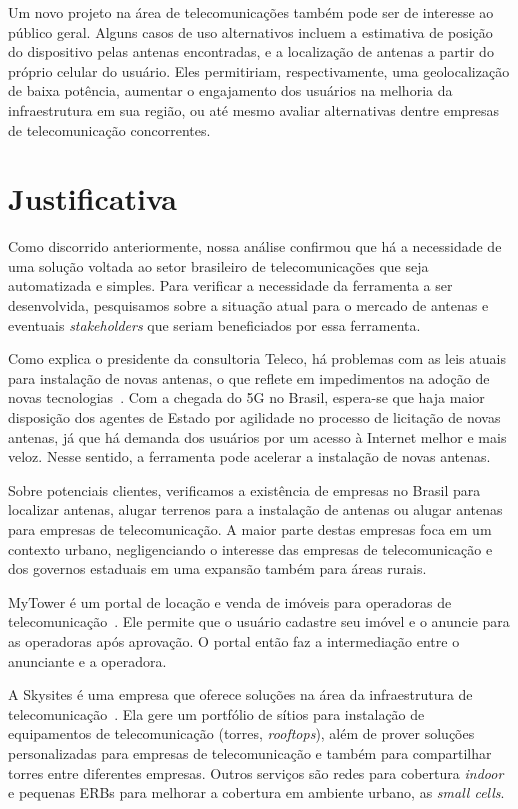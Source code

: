 \documentclass[]{politex}
\begin{document}
Um novo projeto na área de telecomunicações também pode ser de interesse ao
público geral. Alguns casos de uso alternativos incluem a estimativa de posição
do dispositivo pelas antenas encontradas, e a localização de antenas a partir do
próprio celular do usuário. Eles permitiriam, respectivamente, uma
geolocalização de baixa potência, aumentar o engajamento dos usuários na
melhoria da infraestrutura em sua região, ou até mesmo avaliar alternativas
dentre empresas de telecomunicação concorrentes.

\section{Justificativa}

Como discorrido anteriormente, nossa análise confirmou
que há a necessidade de uma solução voltada ao setor brasileiro de
telecomunicações que seja automatizada e simples. Para verificar a necessidade
da ferramenta a ser desenvolvida, pesquisamos sobre a situação atual para o
mercado de antenas e eventuais \textit{stakeholders} que seriam beneficiados por
essa ferramenta.

Como explica o presidente da consultoria Teleco, há problemas com as leis atuais
para instalação de novas antenas, o que reflete em impedimentos na adoção de
novas tecnologias~\cite{tude}. Com a chegada do 5G no Brasil, espera-se que haja
maior disposição dos agentes de Estado por agilidade no processo de licitação de
novas antenas, já que há demanda dos usuários por um acesso à Internet melhor e
mais veloz. Nesse sentido, a ferramenta pode acelerar a instalação de novas
antenas.

Sobre potenciais clientes, verificamos a existência de empresas no Brasil para
localizar antenas, alugar terrenos para a instalação de antenas ou alugar
antenas para empresas de telecomunicação. A maior parte destas empresas foca em
um contexto urbano, negligenciando o interesse das empresas de telecomunicação e
dos governos estaduais em uma expansão também para áreas rurais.

MyTower é um portal de locação e venda de imóveis para operadoras de
telecomunicação~\cite{mytower}. Ele permite que o usuário cadastre seu imóvel e
o anuncie para as operadoras após aprovação. O portal então faz a intermediação
entre o anunciante e a operadora.

A Skysites é uma empresa que oferece soluções na área da infraestrutura de
telecomunicação~\cite{skysites}. Ela gere um portfólio de sítios para instalação
de equipamentos de telecomunicação (torres, \textit{rooftops}), além de prover
soluções personalizadas para empresas de telecomunicação e também para
compartilhar torres entre diferentes empresas. Outros serviços são redes para
cobertura \textit{indoor} e pequenas ERBs para melhorar a cobertura em ambiente
urbano, as \textit{small cells}.
\end{document}
